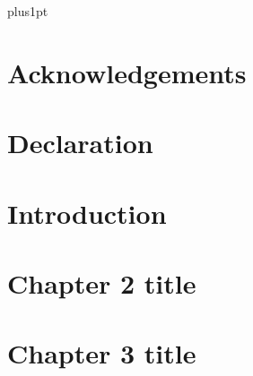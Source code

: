 \documentclass[oneside,12pt]{report}
\begin{document}
\baselineskip=18pt plus1pt

\setcounter{secnumdepth}{3}
\setcounter{tocdepth}{3}

\begin{spacing}{1.5}

\end{spacing}

\newpage\null\thispagestyle{empty}\newpage


\setcounter{page}{2}


\chapter*{Acknowledgements}


\chapter*{Declaration}

\lipsum[1]

\newpage
\tableofcontents


\newpage
\listoffigures  %

\newpage
\listoftables

\chapter{Introduction}



\chapter[Chapter 2 title]{ Chapter 2 title}

 
\chapter[Chapter 3 title]{ Chapter 3 title}


\normalsize
{}
\renewcommand{\bibname}{References}

\end{document}
